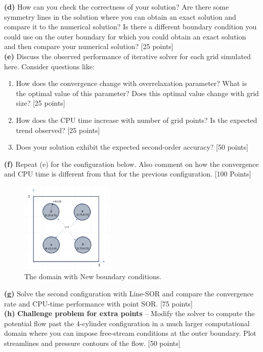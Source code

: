 \documentclass[12pt]{article}
\begin{document}
\textbf{(d)} How can you check the correctness of your solution? Are there 
some symmetry lines in the solution where you can obtain an exact solution 
and compare it to the numerical solution? Is there a different boundary 
condition you could use on the outer boundary for which you could 
obtain an exact solution and then compare your numerical solution? [25 points]\\



\textbf{(e)} Discuss the observed performance of iterative solver for each grid simulated here. Consider questions like:
\begin{enumerate}
        \item How does the convergence change with overrelaxation parameter? What is the optimal value of this parameter? Does this optimal value change with grid size? [25 points]
        \item How does the CPU time increase with number of grid points? Is the expected trend observed? [25 points]
        \item Does your solution exhibit the expected second-order accuracy? [50 points]
\end{enumerate}

\textbf{(f)} Repeat (e) for the configuration below. Also comment on how the convergence and CPU time is different from that for the previous configuration. [100 Points]\\


\begin{figure}[ht!]
    \centering
    \includegraphics[width=0.4\textwidth]{Problem02.jpg}
    \caption{The domain with New boundary conditions.}
\end{figure}


\textbf{(g)} Solve the second configuration with Line-SOR and compare the convergence rate and CPU-time performance with point SOR. [75 points]\\

\textbf{(h)} \textbf{Challenge problem for extra points} -- Modify the solver to compute the potential flow past the 4-cylinder configuration in a much larger computational domain where you can impose free-stream conditions at the outer boundary. Plot streamlines and pressure contours of the flow. [50 points]\\
\end{document}

